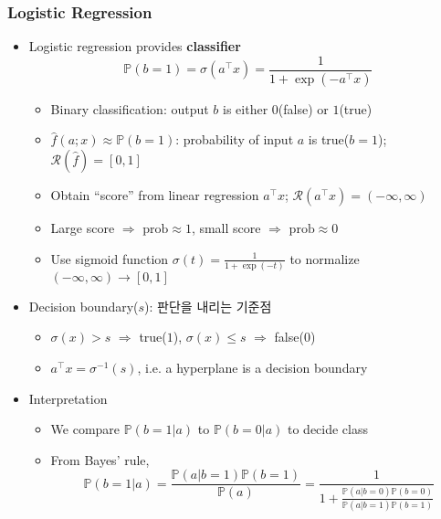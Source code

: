 \subsubsection*{Logistic Regression}
\begin{itemize}
    \item Logistic regression provides \textbf{classifier}
    \begin{equation}\label{eq:dl:logistic-classifier}
        \mathbb{P}(b=1)=\sigma(a^{\top}x)=\frac{1}{1+\exp(-a^{\top}x)}
    \end{equation}
    \begin{itemize}
        \item Binary classification: output $b$ is either $0$(false) or $1$(true)
        \item $\hat{f}(a;x)\approx\mathbb{P}(b=1)$: probability of input $a$ is true($b=1$); $\mathcal{R}(\hat{f})=[0,1]$
        \item Obtain ``score'' from linear regression $a^{\top}x$; $\mathcal{R}(a^{\top}x)=(-\infty,\infty)$
        \item Large score $\Rightarrow$ $\mathrm{prob}\approx1$, small score $\Rightarrow$ $\mathrm{prob}\approx0$
        \item Use sigmoid function $\sigma(t)=\frac{1}{1+\exp(-t)}$ to normalize $(-\infty,\infty)\rightarrow[0,1]$
    \end{itemize}
    \begin{figures}
    \end{figures}
    \item Decision boundary($s$): 판단을 내리는 기준점
    \begin{itemize}
        \item $\sigma(x)>s$ $\Rightarrow$ true($1$), $\sigma(x)\leq s$ $\Rightarrow$ false($0$)
        \item $a^{\top}x=\sigma^{-1}(s)$, i.e. a hyperplane is a decision boundary
    \end{itemize}
    \item Interpretation
    \begin{itemize}
        \item We compare $\mathbb{P}(b=1|a)$ to $\mathbb{P}(b=0|a)$ to decide class
        \item From Bayes' rule,
        \begin{equation}
            \mathbb{P}(b=1|a)=\frac{\mathbb{P}(a|b=1)\mathbb{P}(b=1)}{\mathbb{P}(a)}=\frac{1}{1+\frac{\mathbb{P}(a|b=0)\mathbb{P}(b=0)}{\mathbb{P}(a|b=1)\mathbb{P}(b=1)}}

\end{equation}
\end{itemize}
\end{itemize}
